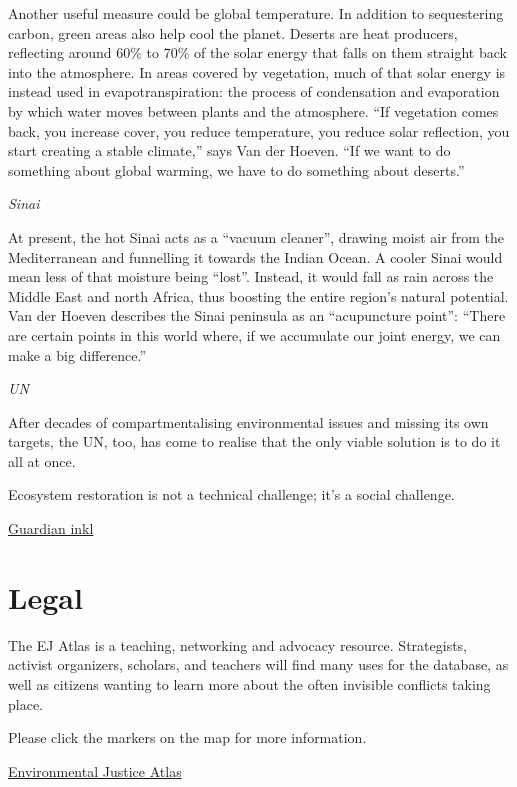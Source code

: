 \documentclass[
]{book}
\begin{document}
Another useful measure could be global temperature. In addition to sequestering carbon, green areas also help cool the planet. Deserts are heat producers, reflecting around 60\% to 70\% of the solar energy that falls on them straight back into the atmosphere. In areas covered by vegetation, much of that solar energy is instead used in evapotranspiration: the process of condensation and evaporation by which water moves between plants and the atmosphere. ``If vegetation comes back, you increase cover, you reduce temperature, you reduce solar reflection, you start creating a stable climate,'' says Van der Hoeven. ``If we want to do something about global warming, we have to do something about deserts.''

\emph{Sinai}

At present, the hot Sinai acts as a ``vacuum cleaner'', drawing moist air from the Mediterranean and funnelling it towards the Indian Ocean. A cooler Sinai would mean less of that moisture being ``lost''. Instead, it would fall as rain across the Middle East and north Africa, thus boosting the entire region's natural potential. Van der Hoeven describes the Sinai peninsula as an ``acupuncture point'': ``There are certain points in this world where, if we accumulate our joint energy, we can make a big difference.''

\emph{UN}

After decades of compartmentalising environmental issues and missing its own targets,
the UN, too, has come to realise that the only viable solution is to do it all at once.

Ecosystem restoration is not a technical challenge; it's a social challenge.

\href{https://www.inkl.com/news/our-biggest-challenge-lack-of-imagination-the-scientists-turning-the-desert-green}{Guardian inkl}

\hypertarget{legal}{%
\section{Legal}\label{legal}}

The EJ Atlas is a teaching, networking and advocacy resource. Strategists, activist organizers, scholars, and teachers will find many uses for the database, as well as citizens wanting to learn more about the often invisible conflicts taking place.

Please click the markers on the map for more information.

\href{https://www.ejatlas.org/}{Environmental Justice Atlas}
\end{document}
